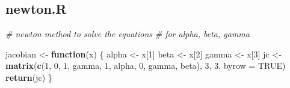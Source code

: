 \documentclass[
  12pt,
]{article}
\newenvironment{Shaded}{\begin{snugshade}}{\end{snugshade}}
\newcommand{\AttributeTok}[1]{\textcolor[rgb]{0.13,0.29,0.53}{#1}}
\newcommand{\CommentTok}[1]{\textcolor[rgb]{0.56,0.35,0.01}{\textit{#1}}}
\newcommand{\ConstantTok}[1]{\textcolor[rgb]{0.56,0.35,0.01}{#1}}
\newcommand{\ControlFlowTok}[1]{\textcolor[rgb]{0.13,0.29,0.53}{\textbf{#1}}}
\newcommand{\DecValTok}[1]{\textcolor[rgb]{0.00,0.00,0.81}{#1}}
\newcommand{\FunctionTok}[1]{\textcolor[rgb]{0.13,0.29,0.53}{\textbf{#1}}}
\newcommand{\NormalTok}[1]{#1}
\newcommand{\OtherTok}[1]{\textcolor[rgb]{0.56,0.35,0.01}{#1}}
\begin{document}
\normalsize

\subsection{newton.R}\label{newton.r}

\footnotesize

\begin{Shaded}
\begin{Highlighting}[]
\CommentTok{\# newton method to solve the equations}
\CommentTok{\# for alpha, beta, gamma}

\NormalTok{jacobian }\OtherTok{\textless{}{-}} \ControlFlowTok{function}\NormalTok{(x) \{}
\NormalTok{  alpha }\OtherTok{\textless{}{-}}\NormalTok{ x[}\DecValTok{1}\NormalTok{]}
\NormalTok{  beta }\OtherTok{\textless{}{-}}\NormalTok{ x[}\DecValTok{2}\NormalTok{]}
\NormalTok{  gamma }\OtherTok{\textless{}{-}}\NormalTok{ x[}\DecValTok{3}\NormalTok{]}
\NormalTok{  jc }\OtherTok{\textless{}{-}} \FunctionTok{matrix}\NormalTok{(}\FunctionTok{c}\NormalTok{(}\DecValTok{1}\NormalTok{, }\DecValTok{0}\NormalTok{, }\DecValTok{1}\NormalTok{, gamma, }\DecValTok{1}\NormalTok{, alpha, }\DecValTok{0}\NormalTok{, gamma, beta), }\DecValTok{3}\NormalTok{, }\DecValTok{3}\NormalTok{, }\AttributeTok{byrow =} \ConstantTok{TRUE}\NormalTok{)}
  \FunctionTok{return}\NormalTok{(jc)}
\NormalTok{\}}


\end{Highlighting}
\end{Shaded}
\end{document}

